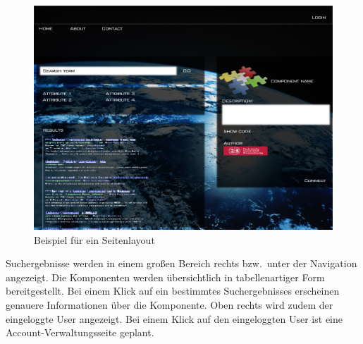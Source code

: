 \begin{figure}
\includegraphics[width=0.8\linewidth]{bilder/overview.jpg}
\caption{Beispiel für ein Seitenlayout}
\label{fig:gui}
\end{figure}

Suchergebnisse werden in einem großen Bereich rechts bzw.\ unter der Navigation angezeigt. 
Die Komponenten werden übersichtlich in tabellenartiger Form bereitgestellt. Bei einem Klick auf ein bestimmtes Suchergebnisses erscheinen genauere Informationen über die Komponente. 
Oben rechts wird zudem der eingeloggte User angezeigt.
Bei einem Klick auf den eingeloggten User ist eine Account-Verwaltungsseite geplant.
